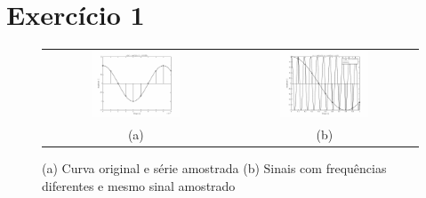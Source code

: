 \section*{Exercício 1}

    \begin{figure}[H]
        \centering
        \begin{tabular}{cc}
        \includegraphics[width=0.5\textwidth]{images/ex1a.eps} & \includegraphics[width=0.5\textwidth]{images/ex1c.eps} \\ (a) & (b)
        \end{tabular}
        \caption{\label{fig:ex1ac} (a) Curva original e série amostrada (b) Sinais com frequências diferentes e mesmo sinal amostrado} 
    \end{figure}
    
